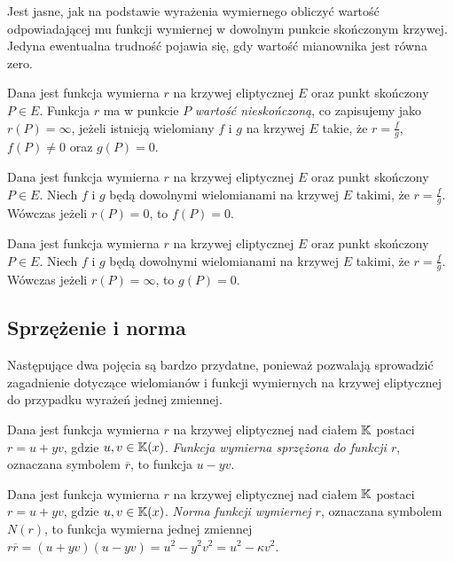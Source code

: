 Jest jasne, jak na podstawie wyrażenia wymiernego
obliczyć wartość odpowiadającej mu funkcji wymiernej
w dowolnym punkcie skończonym krzywej.
Jedyna ewentualna trudność pojawia się,
gdy wartość mianownika jest równa zero.

\begin{definition}
Dana jest funkcja wymierna $r$ na krzywej eliptycznej $E$
oraz punkt skończony $P \in E$.
Funkcja $r$ ma w punkcie $P$ \emph{wartość nieskończoną},
co zapisujemy jako $r(P) = \infty$,
jeżeli istnieją wielomiany $f$ i $g$ na krzywej $E$ takie,
że $r = \frac{f}{g}$, $f(P) \neq 0$ oraz $g(P) = 0$.
\end{definition}

\begin{theorem}
Dana jest funkcja wymierna $r$ na krzywej eliptycznej $E$
oraz punkt skończony $P \in E$.
Niech $f$ i $g$ będą dowolnymi wielomianami na krzywej $E$ takimi,
że $r = \frac{f}{g}$.
Wówczas jeżeli $r(P) = 0$, to $f(P) = 0$.
\end{theorem}

\begin{theorem}
Dana jest funkcja wymierna $r$ na krzywej eliptycznej $E$
oraz punkt skończony $P \in E$.
Niech $f$ i $g$ będą dowolnymi wielomianami na krzywej $E$ takimi,
że $r = \frac{f}{g}$.
Wówczas jeżeli $r(P) = \infty$, to $g(P) = 0$.
\end{theorem}

\subsection*{Sprzężenie i norma}

Następujące dwa pojęcia są bardzo przydatne,
ponieważ pozwalają sprowadzić
zagadnienie dotyczące wielomianów i funkcji wymiernych na krzywej eliptycznej
do przypadku wyrażeń jednej zmiennej.

\begin{definition}
Dana jest funkcja wymierna $r$ na krzywej eliptycznej nad ciałem $\mathbb{K}$
postaci $r = u + yv$, gdzie $u, v \in \mathbb{K}(x)$.
\emph{Funkcja wymierna sprzężona do funkcji $r$},
oznaczana symbolem $\overline{r}$,
to funkcja $u - yv$.
\end{definition}

\begin{definition}
Dana jest funkcja wymierna $r$ na krzywej eliptycznej nad ciałem $\mathbb{K}$
postaci $r = u + yv$, gdzie $u, v \in \mathbb{K}(x)$.
\emph{Norma funkcji wymiernej $r$},
oznaczana symbolem $N(r)$,
to funkcja wymierna jednej zmiennej
$r\overline{r} = (u + yv)(u - yv) = u^2 - y^2v^2 = u^2 - \kappa v^2$.
\end{definition}

